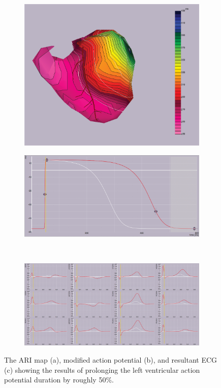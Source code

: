 \documentclass[12pt]{article}
\begin{document}
\begin{figure}[H]
	\begin{subfigure}{.5\textwidth}
		\centering
		\includegraphics[width=.95\linewidth]{Figures/2_2_50ARI.png}
		\caption{}
		
	\end{subfigure}%
	\begin{subfigure}{.5\textwidth}
		\centering
		\includegraphics[width=.95\linewidth]{Figures/2_2_50actionpotential.png}
		\caption{}
		
	\end{subfigure}%
	\\
	\begin{subfigure}{.95\textwidth}
		\centering
		\includegraphics[width=.95\linewidth]{Figures/2_2_50ecg.png}
		\caption{}
		
	\end{subfigure}
	\caption{The ARI map (a), modified action potential (b), and resultant ECG (c) showing the results of prolonging the left ventricular action potential duration by roughly 50\%.}
	\label{2_2_50}
\end{figure}
\end{document}
